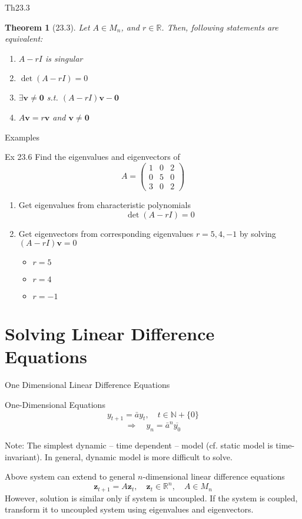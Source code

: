 \documentclass[a4paper,11pt]{article}
\newtheorem{thm}{Theorem}
\newcommand{\bb}{\mathbb}
\newcommand{\bd}{\mathbf}
\begin{document}
\begin{frame}[t]{Th23.3}
	\begin{thm}
		[23.3] Let $A\in M_n$, and $r\in\bb{R}$. Then, following statements are equivalent:
		\begin{enumerate}
			\item $A-rI$ is singular
			\item $\det(A-rI)=0$
			\item $\exists \bd{v}\neq\bd{0}$ s.t. $(A-rI)\bd{v}-\bd{0}$
			\item $A\bd{v}=r\bd{v}$ and $\bd{v}\neq \bd{0}$
		\end{enumerate}
	\end{thm}
\end{frame}

\begin{frame}[t]{Examples}
	\begin{block}
		{Ex 23.6} Find the eigenvalues and eigenvectors of \[
			A = \begin{pmatrix}
				1&0&2\\
				0&5&0\\
				3&0&2
			\end{pmatrix}
		\]
		\begin{enumerate}[Step 1)]
			\item Get eigenvalues from characteristic polynomials
			\[
				\det (A-rI) = 0
			\]
			\item Get eigenvectors from corresponding eigenvalues $r=5,4,-1$ by solving $(A-rI)\bd{v}=0$
			\begin{itemize}
				\item $r=5$
				\item $r=4$
				\item $r=-1$
			\end{itemize}
		\end{enumerate}
	\end{block}
\end{frame}

\section{Solving Linear Difference Equations} %
\label{sec:solving_linear_difference_equations}
\begin{frame}[t]{One Dimensional Linear Difference Equations}
	\begin{block}
		{One-Dimensional Equations}
		\[
			y_{t+1} = \bar{a}y_t, \quad t\in \bb{N}+\{0\}
		\]
		\[
			\Rightarrow\quad y_n = \bar{a}^n \overline{y_0}
		\]
	\end{block}
	Note: The simplest dynamic -- time dependent -- model (cf. static model is time-invariant). In general, dynamic model is more difficult to solve.
	
	Above system can extend to general $n$-dimensional linear difference equations\[
		\bd{z}_{t+1}=A\bd{z}_t, \quad \bd{z}_t\in \bb{R}^n,\quad A\in M_n
	\]
	However, solution is similar only if system is uncoupled. If the system is coupled, transform it to uncoupled system using eigenvalues and eigenvectors. 
\end{frame}
\end{document}
